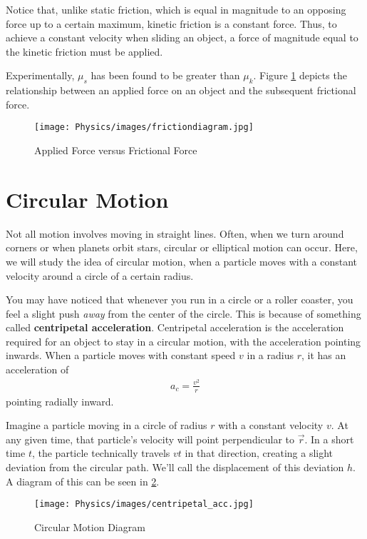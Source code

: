 \documentclass[11pt]{article}
\begin{document}
Notice that, unlike static friction, which is equal in magnitude to an opposing force up to a certain maximum, kinetic friction is a constant force. Thus, to achieve a constant velocity when sliding an object, a force of magnitude equal to the kinetic friction must be applied.

Experimentally, $\mu_s$ has been found to be greater than $\mu_k$. Figure \ref{fig:frictiondiagram} depicts the relationship between an applied force on an object and the subsequent frictional force.

\begin{figure}[H]
    \centering
    \texttt{[image: Physics/images/frictiondiagram.jpg]}
    \caption{Applied Force versus Frictional Force}
    \label{fig:frictiondiagram}
\end{figure}

\section{Circular Motion}

Not all motion involves moving in straight lines. Often, when we turn around corners or when planets orbit stars, circular or elliptical motion can occur. Here, we will study the idea of circular motion, when a particle moves with a constant velocity around a circle of a certain radius.

You may have noticed that whenever you run in a circle or a roller coaster, you feel a slight push \textit{away} from the center of the circle. This is because of something called \textbf{centripetal acceleration}. Centripetal acceleration is the acceleration required for an object to stay in a circular motion, with the acceleration pointing inwards. When a particle moves with constant speed $v$ in a radius $r$, it has an acceleration of 
\begin{align*}
    a_c = \frac{v^2}{r}
\end{align*}
pointing radially inward.

Imagine a particle moving in a circle of radius $r$ with a constant velocity $v$. At any given time, that particle's velocity will point perpendicular to $\Vec{r}$. In a short time $t$, the particle technically travels $vt$ in that direction, creating a slight deviation from the circular path. We'll call the displacement of this deviation $h$. A diagram of this can be seen in \ref{fig:centr_acc}.

\begin{figure}
    \centering
    \texttt{[image: Physics/images/centripetal\_acc.jpg]}
    \caption{Circular Motion Diagram}
    \label{fig:centr_acc}
\end{figure}
\end{document}
